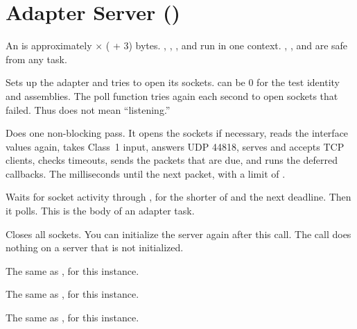 \section{Adapter Server ()}

An  is approximately  $\times$
( + 3) bytes. , ,
, and  run in one context. ,
, and  are safe from any task.

Sets up the adapter and tries to open its sockets.  can be 0
for the test identity and assemblies. The poll function tries again each
second to open sockets that failed. Thus  does not mean
``listening.''

Does one non-blocking pass. It opens the sockets if necessary, reads the
interface values again, takes Class~1 input, answers UDP 44818, serves and
accepts TCP clients, checks timeouts, sends the \TO{} packets that are due,
and runs the deferred callbacks.
\ret The milliseconds until the next \TO{} packet, with a limit of
.

Waits for socket activity through , for the shorter of
 and the next \TO{} deadline. Then it polls. This is the
body of an adapter task.

Closes all sockets. You can initialize the server again after this call. The
call does nothing on a server that is not initialized.

The same as , for this instance.

The same as , for this instance.

The same as , for this instance.

